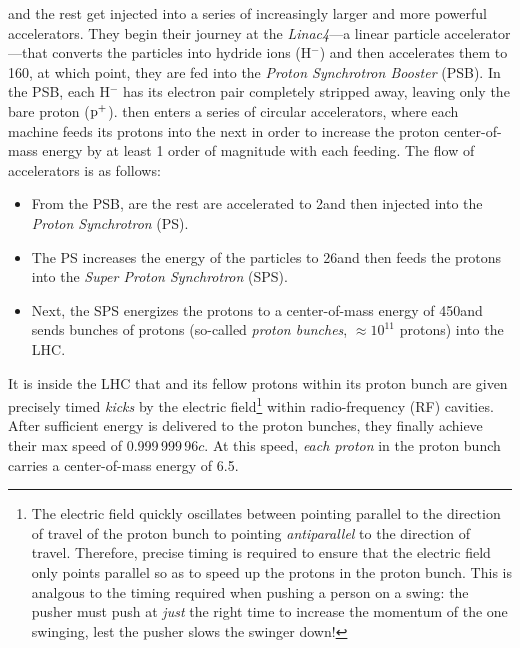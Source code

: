 \pname and the rest get injected into a series of increasingly larger and more powerful accelerators.
They begin their journey at the \emph{Linac4}---a linear particle accelerator---that converts the particles into hydride ions (H$^-$) and then accelerates them to 160\MeV, at which point, they are fed into the \emph{Proton Synchrotron Booster} (PSB).
In the PSB, each H$^-$ has its electron pair completely stripped away, leaving only the bare proton ($\mathrm{p}^+$).
\pname then enters a series of circular accelerators, where each machine feeds its protons into the next in order to increase the proton center-of-mass energy by at least 1 order of magnitude with each feeding.
The flow of accelerators is as follows:
\begin{itemize}
    \item From the PSB, \pname are the rest are accelerated to 2\GeV and then injected into the \emph{Proton Synchrotron} (PS).
    \item The PS increases the energy of the particles to 26\GeV and then feeds the protons into the \emph{Super Proton Synchrotron} (SPS).
    \item Next, the SPS energizes the protons to a center-of-mass energy of 450\GeV and sends bunches of protons (so-called \emph{proton bunches}, $\approx$$10^\text{11}$ protons) into the LHC. %
\end{itemize}
It is inside the LHC that \pname and its fellow protons within its proton bunch are given precisely timed \emph{kicks} by the electric field\footnote{
    The electric field quickly oscillates between pointing parallel to the direction of travel of the proton bunch to pointing \emph{antiparallel} to the direction of travel.
    Therefore, precise timing is required to ensure that the electric field only points parallel so as to speed up the protons in the proton bunch.
    This is analgous to the timing required when pushing a person on a swing:
    the pusher must push at \emph{just} the right time to increase the momentum of the one swinging, lest the pusher slows the swinger down!
} within radio-frequency (RF) cavities.
After sufficient energy is delivered to the proton bunches, they finally achieve their max speed of 0.999\,999\,96$c$. %
At this speed, \emph{each proton} in the proton bunch carries a center-of-mass energy of 6.5\TeV.

